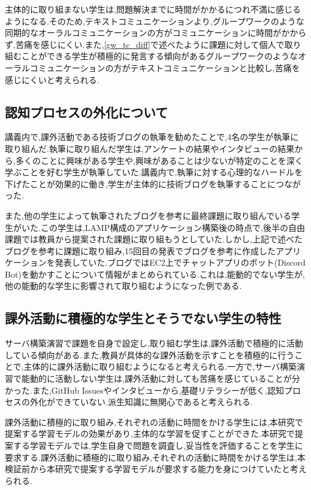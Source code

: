 \documentclass[11pt, a4paper]{jreport}
\begin{document}
主体的に取り組まない学生は,問題解決までに時間がかかるにつれ不満に感じるようになる.そのため,テキストコミュニケーションより,グループワークのような同期的なオーラルコミュニケーションの方がコミュニケーションに時間がかからず,苦痛を感じにくい.また,\ref{gw_tc_diff}で述べたように課題に対して個人で取り組むことができる学生が積極的に発言する傾向があるグループワークのようなオーラルコミュニケーションの方がテキストコミュニケーションと比較し,苦痛を感じにくいと考えられる.

\subsection{認知プロセスの外化について}\label{end_ninnti_gaika}

講義内で,課外活動である技術ブログの執筆を勧めたことで,4名の学生が執筆に取り組んだ.執筆に取り組んだ学生は,アンケートの結果やインタビューの結果から,多くのことに興味がある学生や,興味があることは少ないが特定のことを深く学ぶことを好む学生が執筆していた.講義内で,執筆に対する心理的なハードルを下げたことが効果的に働き,学生が主体的に技術ブログを執筆することにつながった.

また,他の学生によって執筆されたブログを参考に最終課題に取り組んでいる学生がいた.この学生は,LAMP構成のアプリケーション構築後の時点で,後半の自由課題では教員から提案された課題に取り組もうとしていた.しかし,上記で述べたブログを参考に課題に取り組み,15回目の発表でブログを参考に作成したアプリケーションを発表していた.ブログではEC2上でチャットアプリのボット(Discord Bot)を動かすことについて情報がまとめられている.これは,能動的でない学生が,他の能動的な学生に影響されて取り組むようになった例である.

\subsection{課外活動に積極的な学生とそうでない学生の特性}

サーバ構築演習で課題を自身で設定し,取り組む学生は,課外活動で積極的に活動している傾向がある.また,教員が具体的な課外活動を示すことを積極的に行うことで,主体的に課外活動に取り組むようになると考えられる.一方で,サーバ構築演習で能動的に活動しない学生は,課外活動に対しても苦痛を感じていることが分かった.また,GitHub Issuesやインタビューから,基礎リテラシーが低く,認知プロセスの外化ができていない.派生知識に無関心であると考えられる.

課外活動に積極的に取り組み,それぞれの活動に時間をかける学生には,本研究で提案する学習モデルの効果があり,主体的な学習を促すことができた.本研究で提案する学習モデルでは,学生自身で問題を調査し,妥当性を評価することを学生に要求する.課外活動に積極的に取り組み,それぞれの活動に時間をかける学生は,本検証前から本研究で提案する学習モデルが要求する能力を身につけていたと考えられる.
\end{document}
